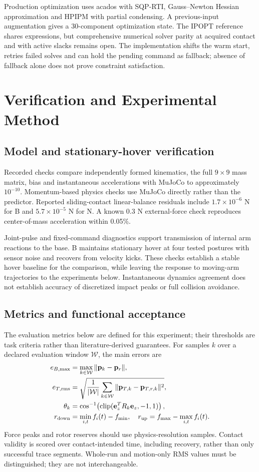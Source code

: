 \documentclass[conference]{IEEEtran}
\begin{document}
Production optimization uses acados \cite{acados} with SQP-RTI, Gauss--Newton Hessian approximation and HPIPM with partial condensing. A previous-input augmentation gives a 30-component optimization state. The IPOPT reference shares expressions, but comprehensive numerical solver parity at acquired contact and with active slacks remains open. The implementation shifts the warm start, retries failed solves and can hold the pending command as fallback; absence of fallback alone does not prove constraint satisfaction.

\section{Verification and Experimental Method}
\subsection{Model and stationary-hover verification}
Recorded checks compare independently formed kinematics, the full $9\times9$ mass matrix, bias and instantaneous accelerations with MuJoCo to approximately $10^{-10}$. Momentum-based physics checks use MuJoCo directly rather than the predictor. Reported sliding-contact linear-balance residuals include $1.7\times10^{-6}$ N for B and $5.7\times10^{-5}$ N for N. A known 0.3 N external-force check reproduces center-of-mass acceleration within 0.05\%.

Joint-pulse and fixed-command diagnostics support transmission of internal arm reactions to the base. B maintains stationary hover at four tested postures with sensor noise and recovers from velocity kicks. These checks establish a stable hover baseline for the comparison, while leaving the response to moving-arm trajectories to the experiments below. Instantaneous dynamics agreement does not establish accuracy of discretized impact peaks or full collision avoidance.

\subsection{Metrics and functional acceptance}
The evaluation metrics below are defined for this experiment; their thresholds are task criteria rather than literature-derived guarantees. For samples $k$ over a declared evaluation window $\mathcal W$, the main errors are
\begin{align}
e_{B,\max}&=\max_{k\in\mathcal W}\|\mathbf p_k-\mathbf p_r\|,\\
e_{T,\rm rms}&=\sqrt{\frac{1}{|\mathcal W|}\sum_{k\in\mathcal W}\|\mathbf p_{T,k}-\mathbf p_{T,r,k}\|^2},\\
\theta_k&=\cos^{-1}\!\left(\operatorname{clip}(\mathbf e_z^TR_k\mathbf e_z,-1,1)\right),\\
r_{\rm down}&=\min_{i,t}f_i(t)-f_{\min},\quad
r_{\rm up}=f_{\max}-\max_{i,t}f_i(t).
\end{align}
Force peaks and rotor reserves should use physics-resolution samples. Contact validity is scored over contact-intended time, including recovery, rather than only successful trace segments. Whole-run and motion-only RMS values must be distinguished; they are not interchangeable.
\end{document}
